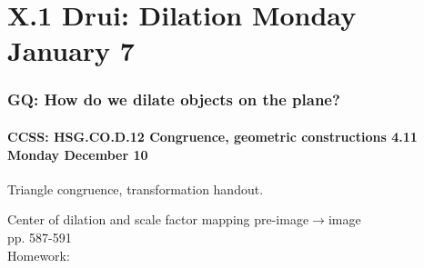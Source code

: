 \documentclass{beamer}
\begin{document}
  \section{X.1 Drui: Dilation Monday January 7}
    \frame
    {
      \frametitle{GQ: How do we dilate objects on the plane?}
      \framesubtitle{CCSS: HSG.CO.D.12 Congruence, geometric constructions  \alert{4.11 Monday December 10}}

      \begin{block}{Triangle congruence, transformation handout.}
      \end{block} \vspace{0.5cm}
      Center of dilation and scale factor mapping pre-image$\rightarrow$image\\
      pp. 587-591\\[0.5cm]
      Homework:
    }
\end{document}
